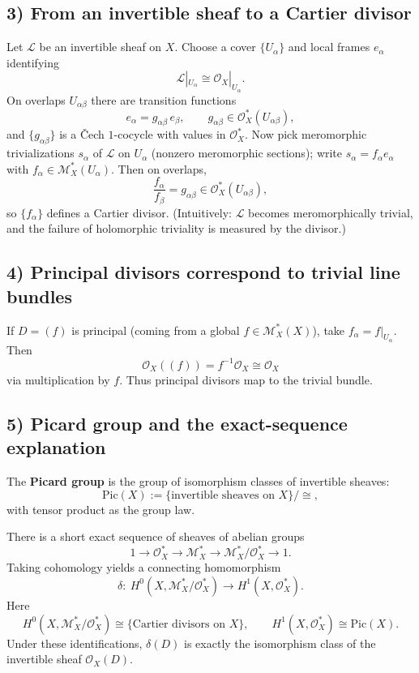 \documentclass[11pt,openany]{article}
\renewcommand{\emph}[1]{\textbf{#1}}
\begin{document}
\subsection*{3) From an invertible sheaf to a Cartier divisor}
Let $\mathcal L$ be an invertible sheaf on $X$.
Choose a cover $\{U_\alpha\}$ and local frames $e_\alpha$ identifying
\[
\mathcal L|_{U_\alpha}\cong \mathcal O_X|_{U_\alpha}.
\]
On overlaps $U_{\alpha\beta}$ there are transition functions
\[
e_\alpha = g_{\alpha\beta}\, e_\beta,\qquad g_{\alpha\beta}\in \mathcal O_X^*(U_{\alpha\beta}),
\]
and $\{g_{\alpha\beta}\}$ is a \v{C}ech $1$-cocycle with values in $\mathcal O_X^*$.
Now pick meromorphic trivializations $s_\alpha$ of $\mathcal L$ on $U_\alpha$ (nonzero meromorphic sections);
write $s_\alpha = f_\alpha e_\alpha$ with $f_\alpha\in \mathcal M_X^*(U_\alpha)$.
Then on overlaps,
\[
\frac{f_\alpha}{f_\beta} = g_{\alpha\beta}\in \mathcal O_X^*(U_{\alpha\beta}),
\]
so $\{f_\alpha\}$ defines a Cartier divisor. (Intuitively: $\mathcal L$ becomes meromorphically trivial, and the
failure of holomorphic triviality is measured by the divisor.)

\subsection*{4) Principal divisors correspond to trivial line bundles}
If $D=(f)$ is principal (coming from a global $f\in \mathcal M_X^*(X)$), take $f_\alpha=f|_{U_\alpha}$.
Then
\[
\mathcal O_X((f)) = f^{-1}\mathcal O_X \cong \mathcal O_X
\]
via multiplication by $f$. Thus principal divisors map to the trivial bundle.

\subsection*{5) Picard group and the exact-sequence explanation}
The \emph{Picard group} is the group of isomorphism classes of invertible sheaves:
\[
\mathrm{Pic}(X):=\{\text{invertible sheaves on }X\}/\cong,
\]
with tensor product as the group law.

There is a short exact sequence of sheaves of abelian groups
\[
1\longrightarrow \mathcal O_X^*\longrightarrow \mathcal M_X^*
\longrightarrow \mathcal M_X^*/\mathcal O_X^*\longrightarrow 1.
\]
Taking cohomology yields a connecting homomorphism
\[
\delta:\ H^0\!\left(X,\mathcal M_X^*/\mathcal O_X^*\right)\longrightarrow H^1(X,\mathcal O_X^*).
\]
Here
\[
H^0\!\left(X,\mathcal M_X^*/\mathcal O_X^*\right)\cong \{\text{Cartier divisors on }X\},
\qquad
H^1(X,\mathcal O_X^*)\cong \mathrm{Pic}(X).
\]
Under these identifications, $\delta(D)$ is exactly the isomorphism class of the invertible sheaf $\mathcal O_X(D)$.
\end{document}

